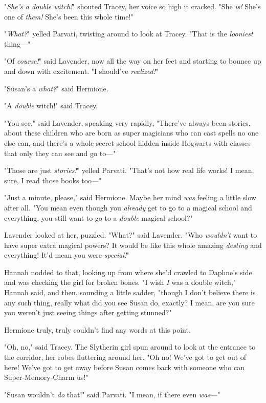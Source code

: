 "\emph{She's a double witch!}" shouted Tracey, her voice so high it cracked.
"She \emph{is!} She's one of \emph{them!} She's been this whole time!"

"\emph{What?}" yelled Parvati, twisting around to look at Tracey. "That is the
\emph{looniest} thing\mbox{---}"

"Of \emph{course!}" said Lavender, now all the way on her feet and starting to
bounce up and down with excitement. "I should've \emph{realized!}"

"Susan's a \emph{what?}" said Hermione.

"A \emph{double} witch!" said Tracey.

"You see," said Lavender, speaking very rapidly, "There've always been stories,
about these children who are born as super magicians who can cast spells no one
else can, and there's a whole secret school hidden inside Hogwarts with classes
that only they can see and go to\mbox{---}"

"Those are just \emph{stories!}" yelled Parvati. "That's not how real life
works! I mean, sure, I read those books too\mbox{---}"

"Just a minute, please," said Hermione. Maybe her mind \emph{was} feeling a
little slow after all. "You mean even though you \emph{already} get to go to a
magical school and everything, you still want to go to a \emph{double} magical
school?"

Lavender looked at her, puzzled. "What?" said Lavender. "Who \emph{wouldn't}
want to have super extra magical powers? It would be like this whole amazing
\emph{destiny} and everything! It'd mean you were \emph{special!}"

Hannah nodded to that, looking up from where she'd crawled to Daphne's side and
was checking the girl for broken bones. "I wish \emph{I} was a double witch,"
Hannah said, and then, sounding a little sadder, "though I don't believe there
is any such thing, really{\el} what did you see Susan do, exactly? I mean,
are you sure you weren't just seeing things after getting stunned?"

Hermione truly, truly couldn't find any words at this point.

"Oh, no," said Tracey. The Slytherin girl spun around to look at the entrance
to the corridor, her robes fluttering around her. "Oh no! We've got to get out
of here! We've got to get away before Susan comes back with someone who can
Super-Memory-Charm us!"

"Susan wouldn't \emph{do} that!" said Parvati. "I mean, if there even
\emph{was}\mbox{---}"

